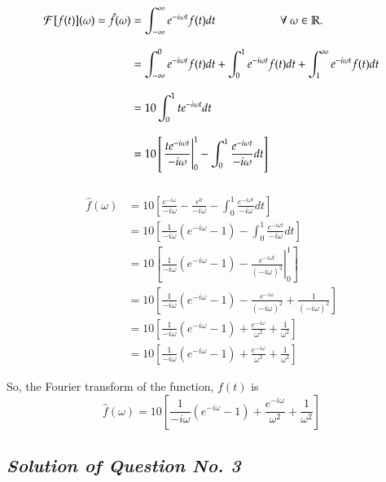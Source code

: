 \documentclass[12pt, a4paper]{article} %
\begin{document}
\begin{equation*}
    \begin{split}
        \mathcal{F}[f(t)](\omega) = \hat{f}(\omega) & = \int_{-\infty}^{\infty}e^{-i\omega t} f(t)dt\hspace*{2cm} \forall\ \omega\in \mathbb{R}.\\[3mm]
        & = \int_{-\infty}^{0}e^{-i\omega t} f(t)dt + \int_{0}^{1}e^{-i\omega t} f(t)dt + \int_{1}^{\infty}e^{-i\omega t} f(t)dt\\[3mm]
        & = 10\int_{0}^{1}te^{-i\omega t} dt\\[3mm]
        & = 10\left[\left.\frac{te^{-i\omega t}}{-i\omega}\right|_{0}^{1} - \int_{0}^{1} \frac{e^{-i\omega t}}{-i\omega} dt\right]\\[3mm]
    \end{split}
\end{equation*}

\begin{equation*}
    \begin{split}
        \hat{f}(\omega) & = 10\left[\frac{e^{-i\omega}}{-i\omega} - \frac{e^{0}}{-i\omega} - \int_{0}^{1} \frac{e^{-i\omega t}}{-i\omega} dt\right]\\[3mm]
        & = 10\left[ \frac{1}{-i\omega} (e^{-i\omega} - 1) - \int_{0}^{1} \frac{e^{-i\omega t}}{-i\omega} dt\right]\\[3mm]
        & =  10\left[\frac{1}{-i\omega} (e^{-i\omega} - 1) - \left.\frac{e^{-i\omega t}}{(-i\omega)^2}\right|_{0}^{1}\right]\\[3mm]
        & =  10\left[\frac{1}{-i\omega} (e^{-i\omega} - 1) - \frac{e^{-i\omega}}{(-i\omega)^2} + \frac{1}{(-i\omega)^2}\right]\\[3mm]
        & =  10\left[\frac{1}{-i\omega} (e^{-i\omega} - 1) + \frac{e^{-i\omega}}{\omega^2} + \frac{1}{\omega^2}\right]\\[3mm]
        & = 10\left[\frac{1}{-i\omega} (e^{-i\omega} - 1) + \frac{e^{-i\omega}}{\omega^2} + \frac{1}{\omega^2}\right]
    \end{split}
\end{equation*}


\BgThispage
So, the Fourier transform of the function, $f(t)$ is
\[\boxed{\hat{f}(\omega)= 10\left[\frac{1}{-i\omega} (e^{-i\omega} - 1) + \frac{e^{-i\omega}}{\omega^2} + \frac{1}{\omega^2}\right]}\]

\subsection{\slshape Solution of Question No. 3}
\end{document}
